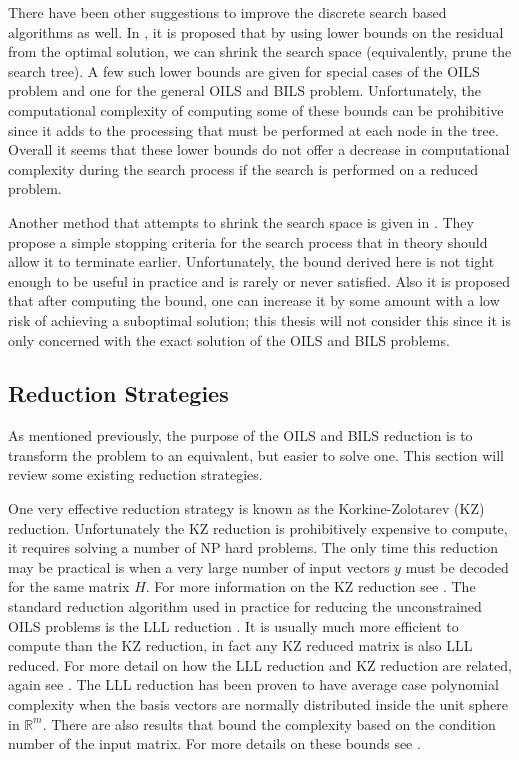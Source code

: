 \documentclass[12pt,Bold,letterpaper]{mcgilletdclass}
\newcommand{\vsp}{\vspace{\baselineskip}}
\begin{document}
There have been other suggestions to improve the discrete search based algorithms as well. In \cite{StoVH08}, it is proposed that by using lower bounds on the residual from the optimal solution, we can shrink the search space (equivalently, prune the search tree). A few such lower bounds are given for special cases of the OILS problem and one for the general OILS and BILS problem. Unfortunately, the computational complexity of computing some of these bounds can be prohibitive since it adds to the processing that must be performed at each node in the tree. Overall it seems that these lower bounds do not offer a decrease in computational complexity during the search process if the search is performed on a reduced problem.

Another method that attempts to shrink the search space is given in \cite{SchFL09}. They propose a simple stopping criteria for the search process that in theory should allow it to terminate earlier. Unfortunately, the bound derived here is not tight enough to be useful in practice and is rarely or never satisfied. Also it is proposed that after computing the bound, one can increase it by some amount with a low risk of achieving a suboptimal solution; this thesis will not consider this since it is only concerned with the exact solution of the OILS and BILS problems. 

\vsp \subsection{Reduction Strategies}

As mentioned previously, the purpose of the OILS and BILS reduction is to transform the problem to an equivalent, but easier to solve one. This section will review some existing reduction strategies.

One very effective reduction strategy is known as the Korkine-Zolotarev (KZ) reduction. Unfortunately the KZ reduction is prohibitively expensive to compute, it requires solving a number of NP hard problems. The only time this reduction may be practical is when a very large number of input vectors $y$ must be decoded for the same matrix $H$. For more information on the KZ reduction see \cite{AgrEVZ02}. The standard reduction algorithm used in practice for reducing the unconstrained OILS problems is the LLL reduction \cite{LenLL82}. It is usually much more efficient to compute than the KZ reduction, in fact any KZ reduced matrix is also LLL reduced. For more detail on how the LLL reduction and KZ reduction are related, again see \cite{AgrEVZ02}. The LLL reduction has been proven to have average case polynomial complexity when the basis vectors are normally distributed inside the unit sphere in $\mathbb{R}^m$. There are also results that bound the complexity based on the condition number of the input matrix. For more details on these bounds see \cite{WubSJM11}.
\end{document}
